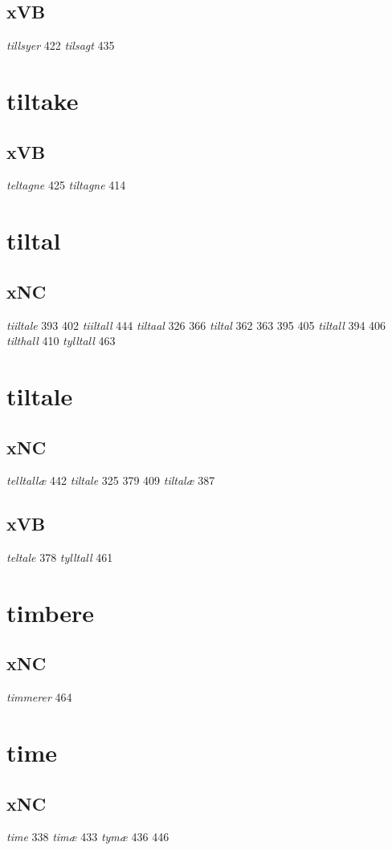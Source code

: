 \documentclass[a4paper,twocolumn]{article}
\begin{document}
\subsection{xVB}
\label{sec:orgc197937}
\emph{tillsyer} 422 \emph{tilsagt} 435 
\section{tiltake}
\label{sec:org9be052b}
\subsection{xVB}
\label{sec:org5be63c7}
\emph{teltagne} 425 \emph{tiltagne} 414 
\section{tiltal}
\label{sec:org5c6d7f7}
\subsection{xNC}
\label{sec:orga953033}
\emph{tiiltale} 393 402 \emph{tiiltall} 444 \emph{tiltaal} 326 366 \emph{tiltal} 362 363 395 405 \emph{tiltall} 394 406 \emph{tilthall} 410 \emph{tylltall} 463 
\section{tiltale}
\label{sec:org970dc19}
\subsection{xNC}
\label{sec:org5685365}
\emph{telltallæ} 442 \emph{tiltale} 325 379 409 \emph{tiltalæ} 387 
\subsection{xVB}
\label{sec:org98cb150}
\emph{teltale} 378 \emph{tylltall} 461 
\section{timbere}
\label{sec:org19edcfe}
\subsection{xNC}
\label{sec:org29aa5a6}
\emph{timmerer} 464 
\section{time}
\label{sec:orgaa45ec9}
\subsection{xNC}
\label{sec:org395906b}
\emph{time} 338 \emph{timæ} 433 \emph{tymæ} 436 446 
\end{document}
